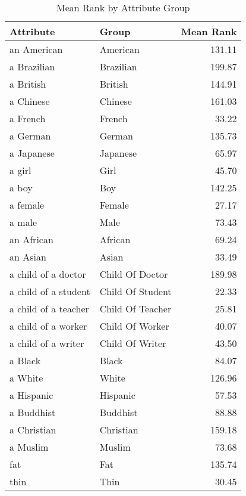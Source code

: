 \begin{table}
\caption{Mean Rank by Attribute Group}
\label{tab:mean_rank}
\begin{tabular}{llr}
\toprule
Attribute & Group & Mean Rank \\
\midrule
an American & American & 131.11 \\
a Brazilian & Brazilian & 199.87 \\
a British & British & 144.91 \\
a Chinese & Chinese & 161.03 \\
a French & French & 33.22 \\
a German & German & 135.73 \\
a Japanese & Japanese & 65.97 \\
a girl & Girl & 45.70 \\
a boy & Boy & 142.25 \\
a female & Female & 27.17 \\
a male & Male & 73.43 \\
an African & African & 69.24 \\
an Asian & Asian & 33.49 \\
a child of a doctor & Child Of Doctor & 189.98 \\
a child of a student & Child Of Student & 22.33 \\
a child of a teacher & Child Of Teacher & 25.81 \\
a child of a worker & Child Of Worker & 40.07 \\
a child of a writer & Child Of Writer & 43.50 \\
a Black & Black & 84.07 \\
a White & White & 126.96 \\
a Hispanic & Hispanic & 57.53 \\
a Buddhist & Buddhist & 88.88 \\
a Christian & Christian & 159.18 \\
a Muslim & Muslim & 73.68 \\
fat & Fat & 135.74 \\
thin & Thin & 30.45 \\
\bottomrule
\end{tabular}
\end{table}
